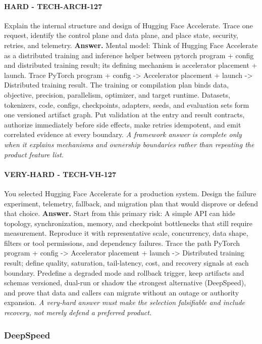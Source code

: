 \paragraph{HARD - TECH-ARCH-127} Explain the internal structure and design of Hugging Face Accelerate. Trace one request, identify the control plane and data plane, and place state, security, retries, and telemetry.
\textbf{Answer.} Mental model: Think of Hugging Face Accelerate as a distributed training and inference helper between pytorch program + config and distributed training result; its defining mechanism is accelerator placement + launch. Trace PyTorch program + config -> Accelerator placement + launch -> Distributed training result. The training or compilation plan binds data, objective, precision, parallelism, optimizer, and target runtime. Datasets, tokenizers, code, configs, checkpoints, adapters, seeds, and evaluation sets form one versioned artifact graph. Put validation at the entry and result contracts, authorize immediately before side effects, make retries idempotent, and emit correlated evidence at every boundary.
\textit{A framework answer is complete only when it explains mechanisms and ownership boundaries rather than repeating the product feature list.}
\paragraph{VERY-HARD - TECH-VH-127} You selected Hugging Face Accelerate for a production system. Design the failure experiment, telemetry, fallback, and migration plan that would disprove or defend that choice.
\textbf{Answer.} Start from this primary risk: A simple API can hide topology, synchronization, memory, and checkpoint bottlenecks that still require measurement. Reproduce it with representative scale, concurrency, data shape, filters or tool permissions, and dependency failures. Trace the path PyTorch program + config -> Accelerator placement + launch -> Distributed training result; define quality, saturation, tail-latency, cost, and recovery signals at each boundary. Predefine a degraded mode and rollback trigger, keep artifacts and schemas versioned, dual-run or shadow the strongest alternative (DeepSpeed), and prove that data and callers can migrate without an outage or authority expansion.
\textit{A very-hard answer must make the selection falsifiable and include recovery, not merely defend a preferred product.}
\subsubsection*{DeepSpeed}
